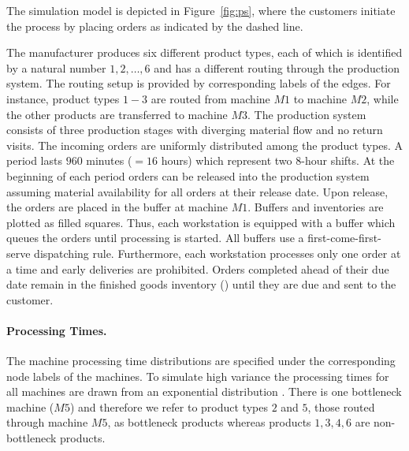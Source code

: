 \documentclass[envcountsame]{llncs}
\begin{document}
The simulation model is depicted in Figure~\ref{fig:ps}, where the customers initiate the process by
placing orders as indicated by the dashed line.
%
\begin{figure*}[t!]
  \centering
  \caption{Production System of the Simulation Model with routing, processing time distributions and
    demand interarrival time distributions.} \label{fig:ps}
\end{figure*}
%
%
The manufacturer produces six different product types, each of which is identified by a natural
number ${1,2,\ldots,6}$ and has a different routing through the production system. The routing setup
is provided by corresponding labels of the edges. For instance, product types $1-3$ are routed from
machine $M1$ to machine $M2$, while the other products are transferred to machine $M3$. The
production system consists of three production stages with diverging material flow and no return
visits.
%
The incoming orders are uniformly distributed among the product types.
%
A period lasts $960$ minutes ($=16$ hours) which represent two \(8\)-hour shifts. At the
beginning of each period orders can be released into the production system assuming material
availability for all orders at their release date. Upon release, the orders are
placed in the buffer at machine $M1$. Buffers and inventories are plotted as filled squares. Thus,
each workstation is equipped with a buffer which queues the orders until processing is started. All
buffers use a first-come-first-serve dispatching rule.
%
Furthermore, each workstation processes only one order at a time and early deliveries are
prohibited. Orders completed ahead of their due date remain in the finished goods inventory (\fgi{})
until they are due and sent to the customer.


\paragraph{Processing Times.} The machine processing time distributions are specified under the
corresponding node labels of the machines. To simulate high %
variance the processing times for all machines are drawn from an exponential %
distribution%
. There is one bottleneck machine ($M5$) and therefore we refer to product types $2$ and $5$, those
routed through machine $M5$, as bottleneck products whereas products $1,3,4,6$ are non-bottleneck
products.
\end{document}
